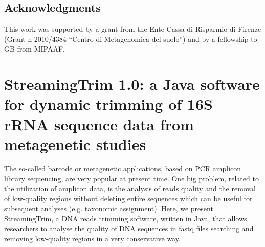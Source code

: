 \subsection{Acknowledgments}
This work was supported by a grant from the Ente Cassa di Risparmio di Firenze (Grant n{\textdegree} 2010/4384 ``Centro di Metagenomica del suolo'') and by a fellowship to GB from MIPAAF.

\section[StreamingTrim 1.0: a Java software for dynamic trimming of 16S rRNA sequence data from metagenetic studies]{StreamingTrim 1.0: a Java software for dynamic trimming of 16S rRNA sequence data from metagenetic studies%
}

The so-called barcode or metagenetic applications, based on PCR amplicon library sequencing, are very popular at present time. One big problem, related to the utilization of amplicon data, is the analysis of reads quality and the removal of low-quality regions without deleting entire sequences which can be useful for subsequent analyses (e.g. taxonomic assignment). Here, we present StreamingTrim, a DNA reads trimming software, written in Java, that allows researchers to analyse the quality of DNA sequences in fastq files searching and removing low-quality regions in a very conservative way.\\
\newpage

\newpage

\backmatter
{}
\renewcommand{\sectionmark}[1]{\markright{#1}}
\sectionmark{Bibliography}
